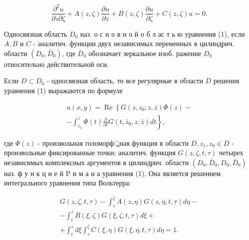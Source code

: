 \documentclass[10pt]{article}
\begin{document}
\[

\frac{\partial^{2} u}{\partial z \partial \zeta}+A(z, \zeta) \frac{\partial u}{\partial z}+B(z, \zeta) \frac{\partial u}{\partial \zeta}+C(z, \zeta) u=0 .

\]



Односвязная область $D_{0}$ наз. о с н о в н о й о б л ас т ь ю уравнения (1), если $A, B$ и $C$ - аналитич. функции двух независимых переменных в цилиндрич. области $\left(D_{0}, \bar{D}_{0}\right)$, где $\bar{D}_{0}$ обозначает зеркальное изоб. ражение $D_{0}$ относительно действительной оси.



Если $D \subset D_{0}$ - односвязная область, то все регулярные в области $D$ решения уравнения (1) выражаются по формуле



\[

\begin{gathered}

u(x, y)=\operatorname{Re}\left\{G\left(z, z_{0} ; z, \bar{z}\right) \Phi(z)-\right. \\

\left.-\int_{z_{1}}^{z} \Phi(t) \frac{\partial}{\partial t} G\left(t, \bar{z}_{0}, z, \bar{z}\right) d t\right\},

\end{gathered}

\]



где $\Phi(z)$ - произвольная голоморф্রная функция в области $D, z_{1}, z_{0} \in D$ - произвольные фиксированные точки; аналитич. функция $G(z, \zeta, t, \tau)$ четырех независимых комплексных аргументов в цилиндрич. области $\left(D_{0}, \bar{D}_{0}, D_{0}, \bar{D}_{0}\right)$ наз. ф у н к ц и е й $\mathrm{P}$ и м а н а уравнения (1). Она является решением интегрального уравнения типа Вольтерра:



\[

\begin{gathered}

G(z, \zeta, t, \tau)-\int_{\tau}^{\zeta} A(z, \eta) G(z, \eta, t, \tau) d \eta- \\

-\int_{t}^{z} B(\xi, \zeta) G(\xi, \zeta, t, \tau) d \xi+ \\

+\int_{t}^{z} d \xi \int_{\tau}^{\zeta} C(\xi, \eta) G(\xi, \eta, t, \tau) d \eta=1 .

\end{gathered}

\]
\end{document}
